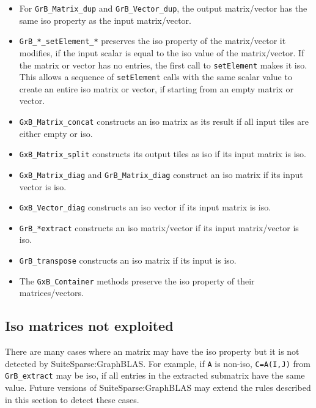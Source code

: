 \begin{itemize}
\item
For \verb'GrB_Matrix_dup' and \verb'GrB_Vector_dup', the output matrix/vector
has the same iso property as the input matrix/vector.

\item
\verb'GrB_*_setElement_*' preserves the iso property of the matrix/vector it
modifies, if the input scalar is equal to the iso value of the matrix/vector.
If the matrix or vector has no entries, the first call to \verb'setElement'
makes it iso.  This allows a sequence of \verb'setElement' calls with the same
scalar value to create an entire iso matrix or vector, if starting from
an empty matrix or vector.

\item
\verb'GxB_Matrix_concat' constructs an iso matrix as its result if all input
tiles are either empty or iso.

\item
\verb'GxB_Matrix_split' constructs its output tiles as iso if its input
matrix is iso.

\item
\verb'GxB_Matrix_diag' and \verb'GrB_Matrix_diag' construct an iso matrix if
its input vector is iso.

\item
\verb'GxB_Vector_diag' constructs an iso vector if its input matrix is iso.

\item
\verb'GrB_*extract' constructs an iso matrix/vector if its input matrix/vector
is iso.

\item
\verb'GrB_transpose' constructs an iso matrix if its input is iso.

\item
The \verb'GxB_Container' methods preserve the iso property
of their matrices/vectors.
\end{itemize}

\subsection{Iso matrices not exploited}

There are many cases where an matrix may have the iso property but it is not
detected by SuiteSparse:GraphBLAS.  For example, if \verb'A' is non-iso,
\verb'C=A(I,J)' from \verb'GrB_extract' may be iso, if all entries in the
extracted submatrix have the same value.  Future versions of
SuiteSparse:GraphBLAS may extend the rules described in this section to detect
these cases.

